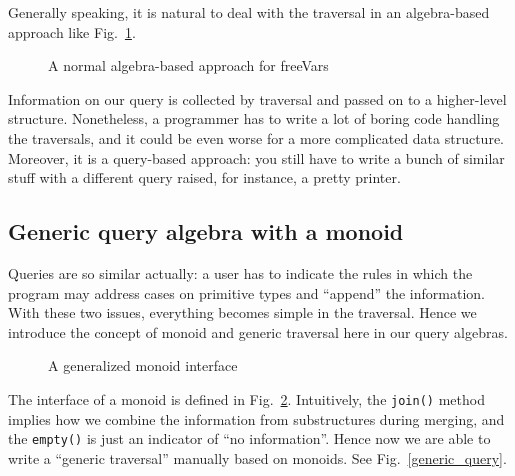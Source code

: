 Generally speaking, it is natural to deal with the traversal in an algebra-based approach like Fig.~\ref{freevars_without_monoid}.

\begin{figure}[tb]
\vspace{-.1in}
\caption{A normal algebra-based approach for freeVars}
\label{freevars_without_monoid}
\end{figure}
\begin{comment}
\bruno{put code in a figure, add a caption and refer
  to the figure in the text.}
\end{comment}

Information on our query is collected by traversal and passed on to a
higher-level structure. Nonetheless, a programmer has to write a lot
of boring code handling the traversals, and it could be even worse for
a more complicated data structure. Moreover, it is a query-based
approach: you still have to write a bunch of similar stuff with a
different query raised, for instance, a pretty printer.

\subsection{Generic query algebra with a monoid}\label{subsec:genericquery}

Queries are so similar actually: a user has to indicate the rules in
which the program may address cases on primitive types and ``append''
the information. With these two issues, everything becomes simple in
the traversal. Hence we introduce the concept of monoid and generic
traversal here in our query algebras.

\begin{figure}[tb]
\vspace{-.1in}
\caption{A generalized monoid interface}
\label{monoid}
\end{figure}

The interface of a monoid is defined in Fig.~\ref{monoid}. Intuitively, the \lstinline{join()}
method implies how we combine the information from substructures during
merging, and the \lstinline{empty()} is just an indicator of ``no
information''. Hence now we are able to write a ``generic traversal''
manually based on monoids. See Fig.~\ref{generic_query}.
\begin{comment}
\bruno{As you can see, nothing
  follows! Please refer to the figure instead and briefly explain the
  code in the figure.}
\end{comment}

